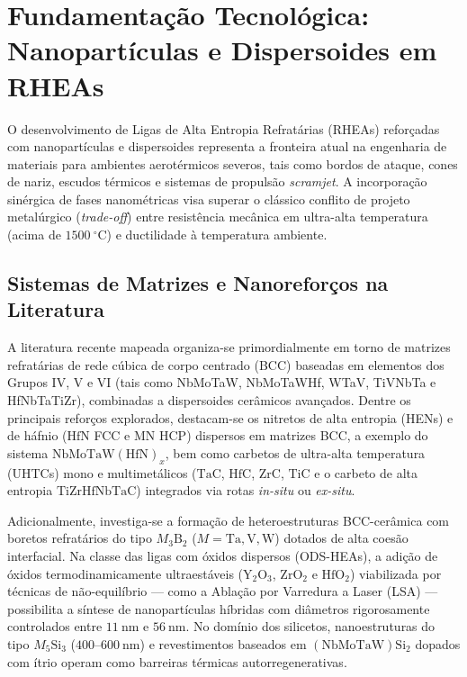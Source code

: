 \section{Fundamentação Tecnológica: Nanopartículas e Dispersoides em RHEAs}\label{sec:fundamentacao_nanoparticulas_rhea}

O desenvolvimento de Ligas de Alta Entropia Refratárias (RHEAs) reforçadas com nanopartículas e dispersoides representa a fronteira atual na engenharia de materiais para ambientes aerotérmicos severos, tais como bordos de ataque, cones de nariz, escudos térmicos e sistemas de propulsão \emph{scramjet}. A incorporação sinérgica de fases nanométricas visa superar o clássico conflito de projeto metalúrgico (\emph{trade-off}) entre resistência mecânica em ultra-alta temperatura (acima de $1500~^\circ\mathrm{C}$) e ductilidade à temperatura ambiente.

\subsection{Sistemas de Matrizes e Nanoreforços na Literatura}\label{subsec:sistemas_matrizes_nanoreforcos}

A literatura recente mapeada organiza-se primordialmente em torno de matrizes refratárias de rede cúbica de corpo centrado (BCC) baseadas em elementos dos Grupos IV, V e VI (tais como NbMoTaW, NbMoTaWHf, WTaV, TiVNbTa e HfNbTaTiZr), combinadas a dispersoides cerâmicos avançados. Dentre os principais reforços explorados, destacam-se os nitretos de alta entropia (HENs) e de háfnio ($\mathrm{HfN}$ FCC e $\mathrm{MN}$ HCP) dispersos em matrizes BCC, a exemplo do sistema $\mathrm{NbMoTaW(HfN)}_x$, bem como carbetos de ultra-alta temperatura (UHTCs) mono e multimetálicos ($\mathrm{TaC}$, $\mathrm{HfC}$, $\mathrm{ZrC}$, $\mathrm{TiC}$ e o carbeto de alta entropia $\mathrm{TiZrHfNbTaC}$) integrados via rotas \emph{in-situ} ou \emph{ex-situ}.

Adicionalmente, investiga-se a formação de heteroestruturas BCC-cerâmica com boretos refratários do tipo $M_3\mathrm{B}_2$ ($M = \mathrm{Ta}, \mathrm{V}, \mathrm{W}$) dotados de alta coesão interfacial. Na classe das ligas com óxidos dispersos (ODS-HEAs), a adição de óxidos termodinamicamente ultraestáveis ($\mathrm{Y}_2\mathrm{O}_3$, $\mathrm{ZrO}_2$ e $\mathrm{HfO}_2$) viabilizada por técnicas de não-equilíbrio --- como a Ablação por Varredura a Laser (LSA) --- possibilita a síntese de nanopartículas híbridas com diâmetros rigorosamente controlados entre $11~\mathrm{nm}$ e $56~\mathrm{nm}$. No domínio dos silicetos, nanoestruturas do tipo $M_5\mathrm{Si}_3$ ($400$--$600~\mathrm{nm}$) e revestimentos baseados em $(\mathrm{NbMoTaW})\mathrm{Si}_2$ dopados com ítrio operam como barreiras térmicas autorregenerativas.

